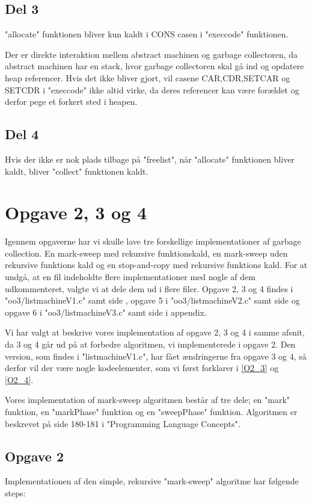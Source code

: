 \subsection{Del 3}
\label{O1_3}
"allocate" funktionen bliver kun kaldt i CONS casen i "execcode" funktionen.  

Der er direkte interaktion mellem abstract machinen og garbage collectoren, da abstract machinen har en stack, hvor garbage collectoren skal gå ind og opdatere heap referencer. Hvis det ikke bliver gjort, vil casene CAR,CDR,SETCAR og SETCDR i "execcode" ikke altid virke, da deres referencer kan være forældet og derfor pege et forkert sted i heapen. 

\subsection{Del 4}
\label{O1_4}
Hvis der ikke er nok plads tilbage på "freelist", når "allocate" funktionen bliver kaldt, bliver "collect" funktionen kaldt.

\section{Opgave 2, 3 og 4}
\label{O2}
Igennem opgaverne har vi skulle lave tre forskellige implementationer af garbage collection. En mark-sweep med rekursive funktionskald, en mark-sweep uden rekursive funktions kald og en stop-and-copy med rekursive funktions kald. For at undgå, at en fil indeholdte flere implementationer med nogle af dem udkommenteret, valgte vi at dele dem ud i flere filer. Opgave 2, 3 og 4 findes i "oo3/listmachineV1.c" samt side \pageref{Code_V1}, opgave 5 i "oo3/listmachineV2.c" samt side \pageref{Code_V2} og opgave 6 i "oo3/listmachineV3.c" samt side \pageref{Code_V3} i appendix.

Vi har valgt at beskrive vores implementation af opgave 2, 3 og 4 i samme afsnit, da 3 og 4 går ud på at forbedre algoritmen, vi implementerede i opgave 2. Den version, som findes i "listmachineV1.c", har fået ændringerne fra opgave 3 og 4, så derfor vil der være nogle kodeelementer, som vi først forklarer i \ref{O2_3} og \ref{O2_4}.

Vores implementation of mark-sweep algoritmen består af tre dele; en "mark" funktion, en "markPhase" funktion og en "sweepPhase" funktion. Algoritmen er beskrevet på side 180-181 i "Programming Language Concepts".

\subsection{Opgave 2}
\label{O2_2}
Implementationen af den simple, rekursive "mark-sweep" algoritme har følgende steps:

